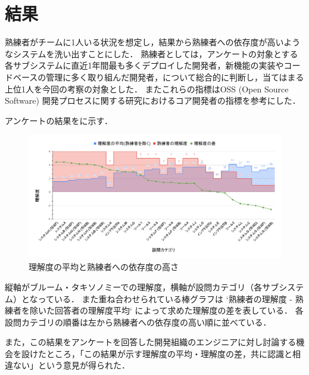 \section{結果}
熟練者がチームに1人いる状況を想定し，結果から熟練者への依存度が高いようなシステムを洗い出すことにした．
熟練者としては，アンケートの対象とする各サブシステムに直近1年間最も多くデプロイした開発者，新機能の実装やコードベースの管理に多く取り組んだ開発者，について総合的に判断し，当てはまる上位1人を今回の考察の対象とした．
またこれらの指標はOSS (Open Source Software) 開発プロセスに関する研究\cite{bib:mockus}におけるコア開発者の指標を参考にした．

アンケートの結果をに示す．

\begin{figure}[h]
	\centering
	\includegraphics[keepaspectratio,width=0.9\linewidth]{img/rikai.png}
	\caption{理解度の平均と熟練者への依存度の高さ}
	\label{img:rikai}
\end{figure}

縦軸がブルーム・タキソノミーでの理解度，横軸が設問カテゴリ（各サブシステム）となっている．
また重ね合わせられている棒グラフは `熟練者の理解度 - 熟練者を除いた回答者の理解度平均` によって求めた理解度の差を表している．
各設問カテゴリの順番は左から熟練者への依存度の高い順に並べている．

また，この結果をアンケートを回答した開発組織のエンジニアに対し討論する機会を設けたところ，「この結果が示す理解度の平均・理解度の差，共に認識と相違ない」という意見が得られた．
